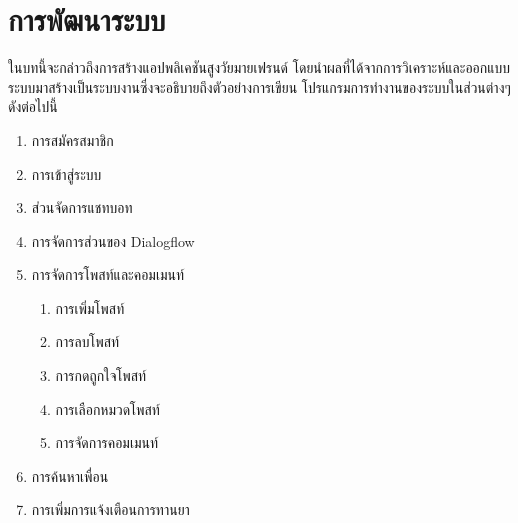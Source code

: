 \chapter{การพัฒนาระบบ}

ในบทนี้จะกล่าวถึงการสร้างแอปพลิเคชันสูงวัยมายเฟรนด์ โดยนำผลที่ได้จากการวิเคราะห์และออกแบบระบบมาสร้างเป็นระบบงานซึ่งจะอธิบายถึงตัวอย่างการเขียน โปรแกรมการทำงานของระบบในส่วนต่างๆดังต่อไปนี้

\begin{enumerate}[label=4.\arabic*]
	\item การสมัครสมาชิก
	\item การเข้าสู่ระบบ
	\item ส่วนจัดการแชทบอท
	\item การจัดการส่วนของ Dialogflow
	\item การจัดการโพสท์และคอมเมนท์
	\begin{enumerate}[label=4.5.\arabic*]
		\item การเพิ่มโพสท์
		\item การลบโพสท์
		\item การกดถูกใจโพสท์
		\item การเลือกหมวดโพสท์
		\item การจัดการคอมเมนท์
	\end{enumerate}	
	\item การค้นหาเพื่อน
	\item การเพิ่มการแจ้งเตือนการทานยา
\end{enumerate}	


